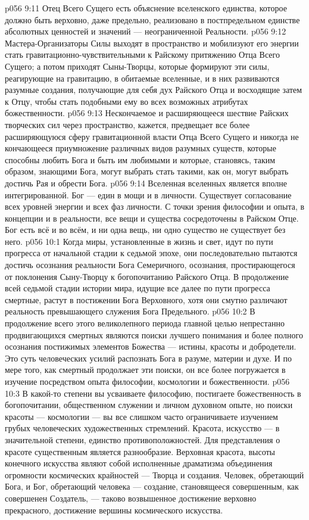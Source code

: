 \vs p056 9:11 Отец Всего Сущего есть объяснение вселенского единства, которое должно быть верховно, даже предельно, реализовано в постпредельном единстве абсолютных ценностей и значений --- неограниченной Реальности.
\vs p056 9:12 Мастера\hyp{}Организаторы Силы выходят в пространство и мобилизуют его энергии стать гравитационно\hyp{}чувствительными к Райскому притяжению Отца Всего Сущего; а потом приходят Сыны\hyp{}Творцы, которые формируют эти силы, реагирующие на гравитацию, в обитаемые вселенные, и в них развиваются разумные создания, получающие для себя дух Райского Отца и восходящие затем к Отцу, чтобы стать подобными ему во всех возможных атрибутах божественности.
\vs p056 9:13 Нескончаемое и расширяющееся шествие Райских творческих сил через пространство, кажется, предвещает все более расширяющуюся сферу гравитационной власти Отца Всего Сущего и никогда не кончающееся приумножение различных видов разумных существ, которые способны любить Бога и быть им любимыми и которые, становясь, таким образом, знающими Бога, могут выбрать стать такими, как он, могут выбрать достичь Рая и обрести Бога.
\vs p056 9:14 Вселенная вселенных является вполне интегрированной. Бог --- един в мощи и в личности. Существует согласование всех уровней энергии и всех фаз личности. С точки зрения философии и опыта, в концепции и в реальности, все вещи и существа сосредоточены в Райском Отце. Бог есть всё и во всём, и ни одна вещь, ни одно существо не существует без него.
\vs p056 10:1 Когда миры, установленные в жизнь и свет, идут по пути прогресса от начальной стадии к седьмой эпохе, они последовательно пытаются достичь осознания реальности Бога Семеричного, осознания, простирающегося от поклонения Сыну\hyp{}Творцу к богопочитанию Райского Отца. В продолжение всей седьмой стадии истории мира, идущие все далее по пути прогресса смертные, растут в постижении Бога Верховного, хотя они смутно различают реальность превышающего служения Бога Предельного.
\vs p056 10:2 В продолжение всего этого великолепного периода главной целью непрестанно продвигающихся смертных являются поиски лучшего понимания и более полного осознания постижимых элементов Божества --- истины, красоты и добродетели. Это суть человеческих усилий распознать Бога в разуме, материи и духе. И по мере того, как смертный продолжает эти поиски, он все более погружается в изучение посредством опыта философии, космологии и божественности.
\vs p056 10:3 \pc В какой\hyp{}то степени вы усваиваете философию, постигаете божественность в богопочитании, общественном служении и личном духовном опыте, но поиски красоты --- космологии --- вы все слишком часто ограничиваете изучением грубых человеческих художественных стремлений. Красота, искусство --- в значительной степени, единство противоположностей. Для представления о красоте существенным является разнообразие. Верховная красота, высоты конечного искусства являют собой исполненные драматизма объединения огромности космических крайностей --- Творца и создания. Человек, обретающий Бога, и Бог, обретающий человека --- создание, становящееся совершенным, как совершенен Создатель, --- таково возвышенное достижение верховно прекрасного, достижение вершины космического искусства.
